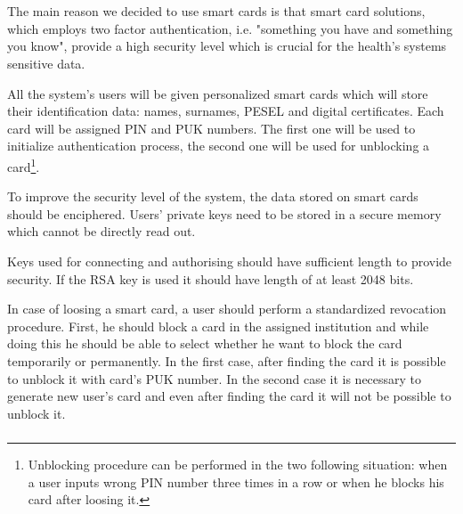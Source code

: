 \chapter{}

\section{}

\subsection{}

The main reason we decided to use smart cards is that smart card solutions, which employs two factor authentication, i.e. "something you have and something you know", provide a high security level which is crucial for the health's systems sensitive data.

All the system's users will be given personalized smart cards which will store their identification data: names, surnames, PESEL and digital certificates. Each card will be assigned PIN and PUK numbers. The first one will be used to initialize authentication process, the second one will be used for unblocking a card\footnote{Unblocking procedure can be performed in the two following situation: when a user inputs wrong PIN number three times in a row or when he blocks his card after loosing it.}. 

To improve the security level of the system, the data  stored on smart cards should be enciphered. Users' private keys need to be stored in a secure memory which cannot be directly read out. 

Keys used for connecting and authorising should have sufficient length to provide security. If the RSA key is used it should have length of at least 2048 bits. 

In case of loosing a smart card, a user should perform a standardized revocation procedure. First, he should block a card in the assigned institution and while doing this he should be able to select whether he want to block the card temporarily or permanently. In the first case, after finding the card it is possible to unblock it with card's PUK number. In the second case it is necessary to generate new user's card and even after finding the card it will not be possible to unblock it.

\subsection{}

